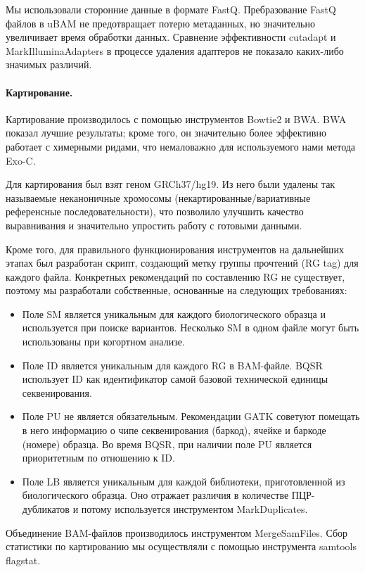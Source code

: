 \documentclass[a4paper,12pt]{article}
\begin{document}
Мы использовали сторонние данные в формате FastQ.
Пребразование FastQ файлов в uBAM не предотвращает потерю метаданных, но значительно увеличивает время обработки данных.
Сравнение эффективности cutadapt и MarkIlluminaAdapters в процессе удаления адаптеров не показало каких-либо значимых различий.

\paragraph{Картирование.}
Картирование производилось с помощью инструментов Bowtie2\cite{Langmead_2012} и BWA\cite{Li_2009}.
BWA показал лучшие результаты;
кроме того, он значительно более эффективно работает с химерными ридами, что немаловажно для используемого нами метода Exo-C.

Для картирования был взят геном GRCh37/hg19.
Из него были удалены так называемые неканоничные хромосомы (некартированные/вариативные референсные последовательности), что позволило улучшить качество выравнивания и значительно упростить работу с готовыми данными.

Кроме того, для правильного функционирования инструментов на дальнейших этапах был разработан скрипт, создающий метку группы прочтений (RG tag) для каждого файла.
Конкретных рекомендаций по составлению RG не существует, поэтому мы разработали собственные, основанные на следующих требованиях\cite{Auwera_2013}:

\begin{itemize}
\item Поле SM является уникальным для каждого биологического образца и используется при поиске вариантов.
Несколько SM в одном файле могут быть использованы при когортном анализе.
\item Поле ID является уникальным для каждого RG в BAM-файле.
BQSR использует ID как идентификатор самой базовой технической единицы секвенирования.
\item Поле PU не является обязательным.
Рекомендации GATK советуют помещать в него информацию о чипе секвенирования (баркод), ячейке и баркоде (номере) образца.
Во время BQSR, при наличии поле PU является приоритетным по отношению к ID.
\item Поле LB является уникальным для каждой библиотеки, приготовленной из биологического образца.
Оно отражает различия в количестве ПЦР-дубликатов и потому используется инструментом MarkDuplicates.
\end{itemize}

Объединение BAM-файлов производилось инструментом MergeSamFiles.
Сбор статистики по картированию мы осуществляли с помощью инструмента samtools flagstat.
\end{document}

